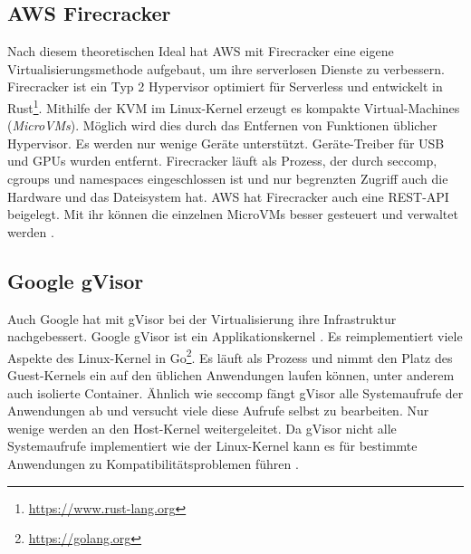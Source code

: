 \subsection{AWS Firecracker}
Nach diesem theoretischen Ideal hat AWS mit Firecracker
eine eigene Virtualisierungsmethode aufgebaut, um ihre
serverlosen Dienste zu verbessern.
Firecracker ist ein Typ 2 Hypervisor optimiert für Serverless
und entwickelt in Rust\footnote{\url{https://www.rust-lang.org}}.
Mithilfe der KVM im Linux-Kernel erzeugt es kompakte
Virtual-Machines (\emph{MicroVMs}). Möglich wird dies durch das
Entfernen von Funktionen üblicher Hypervisor. Es werden nur wenige
Geräte unterstützt. Geräte-Treiber für USB und
GPUs wurden entfernt. Firecracker läuft als Prozess, der durch seccomp,
cgroups und namespaces
eingeschlossen ist und nur begrenzten Zugriff auch die
Hardware und das Dateisystem hat. 
AWS hat Firecracker
auch eine REST-API beigelegt. Mit ihr können die einzelnen
MicroVMs besser gesteuert und verwaltet werden \cite{Firecracker}. 

\subsection{Google gVisor}
Auch Google hat mit gVisor bei der Virtualisierung
ihre Infrastruktur nachgebessert. Google gVisor ist ein
Applikationskernel \cite{gVisor}. Es reimplementiert viele
Aspekte des Linux-Kernel in Go\footnote{\url{https://golang.org}}.
Es läuft als Prozess und nimmt den Platz des Guest-Kernels ein
auf den üblichen Anwendungen laufen können, unter anderem auch
isolierte Container.
Ähnlich wie seccomp fängt gVisor alle Systemaufrufe der
Anwendungen ab und versucht viele diese Aufrufe selbst zu bearbeiten.
Nur wenige werden an den Host-Kernel weitergeleitet. Da gVisor
nicht alle Systemaufrufe implementiert wie der Linux-Kernel
kann es für bestimmte Anwendungen zu Kompatibilitätsproblemen
führen \cite{gVisor}.

